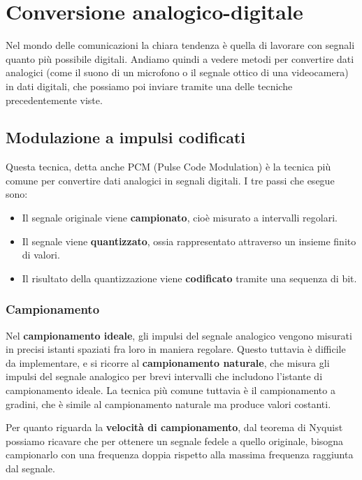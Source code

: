 \section{Conversione analogico-digitale}
    Nel mondo delle comunicazioni la chiara tendenza è quella di lavorare con segnali quanto più possibile digitali. Andiamo quindi a vedere metodi per convertire dati analogici (come il suono di un microfono o il segnale ottico di una videocamera) in dati digitali, che possiamo poi inviare tramite una delle tecniche precedentemente viste.
    
    \subsection{Modulazione a impulsi codificati}
        Questa tecnica, detta anche PCM (Pulse Code Modulation) è la tecnica più comune per convertire dati analogici in segnali digitali. I tre passi che esegue sono:
        \begin{itemize}
            \item Il segnale originale viene \textbf{campionato}, cioè misurato a intervalli regolari.
            
            \item Il segnale viene \textbf{quantizzato}, ossia rappresentato attraverso un insieme finito di valori.
            
            \item Il risultato della quantizzazione viene \textbf{codificato} tramite una sequenza di bit.
        \end{itemize}
        
        \subsubsection{Campionamento}
            Nel \textbf{campionamento ideale}, gli impulsi del segnale analogico vengono misurati in precisi istanti spaziati fra loro in maniera regolare. Questo tuttavia è difficile da implementare, e si ricorre al \textbf{campionamento naturale}, che misura gli impulsi del segnale analogico per brevi intervalli che includono l'istante di campionamento ideale. La tecnica più comune tuttavia è il campionamento a gradini, che è simile al campionamento naturale ma produce valori costanti.
            
            Per quanto riguarda la \textbf{velocità di campionamento}, dal teorema di Nyquist possiamo ricavare che per ottenere un segnale fedele a quello originale, bisogna campionarlo con una frequenza doppia rispetto alla massima frequenza raggiunta dal segnale.
            
